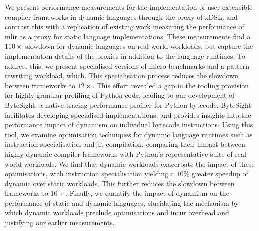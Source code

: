 We present performance measurements for the implementation of user-extensible compiler frameworks in dynamic languages through the proxy of xDSL, and contrast this with a replication of existing work measuring the performance of \ac{mlir} as a proxy for static language implementations. These measurements find a $110\times$ slowdown for dynamic languages on real-world workloads, but capture the implementation details of the proxies in addition to the language runtimes. %
To address this, we present specialised versions of micro-benchmarks and a pattern rewriting workload, which. This specialisation process reduces the slowdown between frameworks to $12\times$.
This effort revealed a gap in the tooling provision for highly granular profiling of Python code, leading to our development of ByteSight, a native tracing performance profiler for Python bytecode. ByteSight facilitates developing specialised implementations, and provides insights into the performance impact of dynamism on individual bytecode instructions.
Using this tool, we examine optimisation techniques for dynamic language runtimes such as instruction specialisation and \ac{jit} compilation, comparing their impact between highly dynamic compiler frameworks with Python's representative suite of real-world workloads. We find that dynamic workloads exacerbate the impact of these optimisations, with instruction specialisation yielding a $10\%$ greater speedup of dynamic over static workloads. This further reduces the slowdown between frameworks to $10\times$.
Finally, we quantify the impact of dynamism on the performance of static and dynamic languages, elucidating the mechanism by which dynamic workloads preclude optimisations and incur overhead and justifying our earlier measurements.



